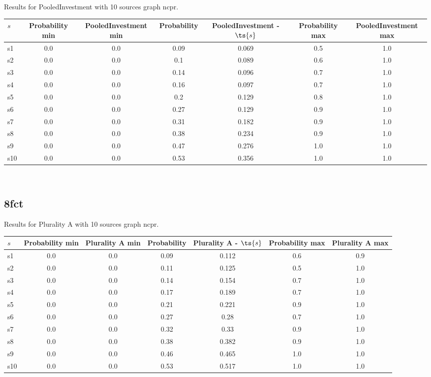 \documentclass{article}
\begin{document}
\noindent Results for PooledInvestment with 10 sources graph ncpr.

\noindent\begin{tabular}{|l|c|c|c|c|c|c|}
\hline
$s$& Probability min & PooledInvestment min & Probability & PooledInvestment - $\ts{s}$ & Probability max & PooledInvestment max\\
\hline
s1 &0.0 & 0.0 & 0.09 & 0.069 & 0.5 & 1.0\\
\hline
s2 &0.0 & 0.0 & 0.1 & 0.089 & 0.6 & 1.0\\
\hline
s3 &0.0 & 0.0 & 0.14 & 0.096 & 0.7 & 1.0\\
\hline
s4 &0.0 & 0.0 & 0.16 & 0.097 & 0.7 & 1.0\\
\hline
s5 &0.0 & 0.0 & 0.2 & 0.129 & 0.8 & 1.0\\
\hline
s6 &0.0 & 0.0 & 0.27 & 0.129 & 0.9 & 1.0\\
\hline
s7 &0.0 & 0.0 & 0.31 & 0.182 & 0.9 & 1.0\\
\hline
s8 &0.0 & 0.0 & 0.38 & 0.234 & 0.9 & 1.0\\
\hline
s9 &0.0 & 0.0 & 0.47 & 0.276 & 1.0 & 1.0\\
\hline
s10 &0.0 & 0.0 & 0.53 & 0.356 & 1.0 & 1.0\\
\hline
\end{tabular}\\

\newpage

\subsection{8fct}

\noindent Results for Plurality A with 10 sources graph ncpr.

\noindent\begin{tabular}{|l|c|c|c|c|c|c|}
\hline
$s$& Probability min & Plurality A min & Probability & Plurality A - $\ts{s}$ & Probability max & Plurality A max\\
\hline
s1 &0.0 & 0.0 & 0.09 & 0.112 & 0.6 & 0.9\\
\hline
s2 &0.0 & 0.0 & 0.11 & 0.125 & 0.5 & 1.0\\
\hline
s3 &0.0 & 0.0 & 0.14 & 0.154 & 0.7 & 1.0\\
\hline
s4 &0.0 & 0.0 & 0.17 & 0.189 & 0.7 & 1.0\\
\hline
s5 &0.0 & 0.0 & 0.21 & 0.221 & 0.9 & 1.0\\
\hline
s6 &0.0 & 0.0 & 0.27 & 0.28 & 0.7 & 1.0\\
\hline
s7 &0.0 & 0.0 & 0.32 & 0.33 & 0.9 & 1.0\\
\hline
s8 &0.0 & 0.0 & 0.38 & 0.382 & 0.9 & 1.0\\
\hline
s9 &0.0 & 0.0 & 0.46 & 0.465 & 1.0 & 1.0\\
\hline
s10 &0.0 & 0.0 & 0.53 & 0.517 & 1.0 & 1.0\\
\hline
\end{tabular}\\
\end{document}
